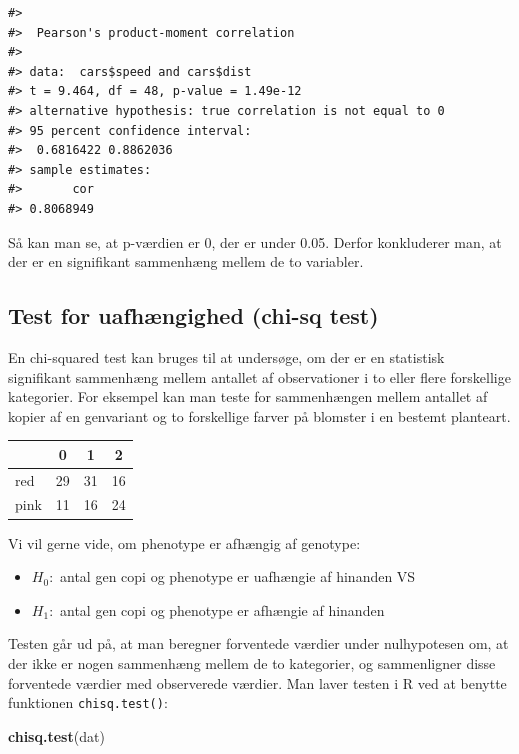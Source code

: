 \documentclass[
]{book}
\newenvironment{Shaded}{\begin{snugshade}}{\end{snugshade}}
\newcommand{\FunctionTok}[1]{\textcolor[rgb]{0.27,0.27,0.27}{\textbf{#1}}}
\newcommand{\NormalTok}[1]{#1}
\providecommand{\tightlist}{%
  \setlength{\itemsep}{0pt}\setlength{\parskip}{0pt}}
\begin{document}
\begin{verbatim}
#> 
#>  Pearson's product-moment correlation
#> 
#> data:  cars$speed and cars$dist
#> t = 9.464, df = 48, p-value = 1.49e-12
#> alternative hypothesis: true correlation is not equal to 0
#> 95 percent confidence interval:
#>  0.6816422 0.8862036
#> sample estimates:
#>       cor 
#> 0.8068949
\end{verbatim}

Så kan man se, at p-værdien er 0, der er under 0.05. Derfor konkluderer man, at der er en signifikant sammenhæng mellem de to variabler.

\subsection{Test for uafhængighed (chi-sq test)}\label{test-for-uafhuxe6ngighed-chi-sq-test}

En chi-squared test kan bruges til at undersøge, om der er en statistisk signifikant sammenhæng mellem antallet af observationer i to eller flere forskellige kategorier. For eksempel kan man teste for sammenhængen mellem antallet af kopier af en genvariant og to forskellige farver på blomster i en bestemt planteart.

\begin{longtable}[]{@{}lccc@{}}
\toprule\noalign{}
& 0 & 1 & 2 \\
\midrule\noalign{}
\endhead
\bottomrule\noalign{}
\endlastfoot
red & 29 & 31 & 16 \\
pink & 11 & 16 & 24 \\
\end{longtable}

Vi vil gerne vide, om phenotype er afhængig af genotype:

\begin{itemize}
\tightlist
\item
  \(H_{0}:\) antal gen copi og phenotype er uafhængie af hinanden VS
\item
  \(H_{1}:\) antal gen copi og phenotype er afhængie af hinanden
\end{itemize}

Testen går ud på, at man beregner forventede værdier under nulhypotesen om, at der ikke er nogen sammenhæng mellem de to kategorier, og sammenligner disse forventede værdier med observerede værdier. Man laver testen i R ved at benytte funktionen \texttt{chisq.test()}:

\begin{Shaded}
\begin{Highlighting}[]
\FunctionTok{chisq.test}\NormalTok{(dat)}
\end{Highlighting}
\end{Shaded}
\end{document}
